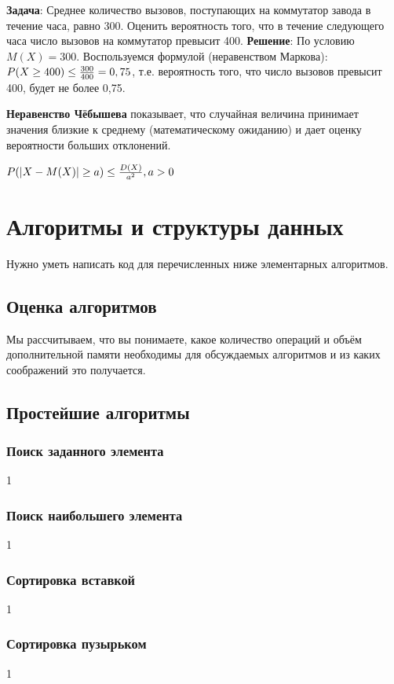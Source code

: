 \documentclass[12pt]{matmex-diploma}
\begin{document}
            \textbf{Задача}: Среднее количество вызовов, поступающих на коммутатор завода в течение часа, равно 300. Оценить вероятность того, что в течение следующего часа число вызовов на коммутатор превысит 400.
            \textbf{Решение}: По условию $M(X) = 300$. Воспользуемся формулой (неравенством Маркова): $P(X \geq 400) \leq {300\over{400}} = 0,75$, т.е. вероятность того, что число вызовов превысит 400, будет не более 0,75.
            
            \textbf{Неравенство Чёбышева} показывает, что случайная величина принимает значения близкие к среднему (математическому ожиданию) и дает оценку вероятности больших отклонений.
            
            $P(|X-M(X)| \geq a) \leq {D(X)\over{a^{2}}}, a>0$
            
\section{Алгоритмы и структуры данных}

    Нужно уметь написать код для перечисленных ниже элементарных алгоритмов.

    \subsection{Оценка алгоритмов}
    
        Мы рассчитываем, что вы понимаете, какое количество операций и объём дополнительной памяти необходимы для обсуждаемых алгоритмов и из каких соображений это получается.
    
    \subsection{Простейшие алгоритмы}
    
        \subsubsection*{Поиск заданного элемента}
            1
        \subsubsection*{Поиск наибольшего элемента}
            1
        \subsubsection*{Сортировка вставкой}
            1
        \subsubsection*{Сортировка пузырьком}
            1
\end{document}
